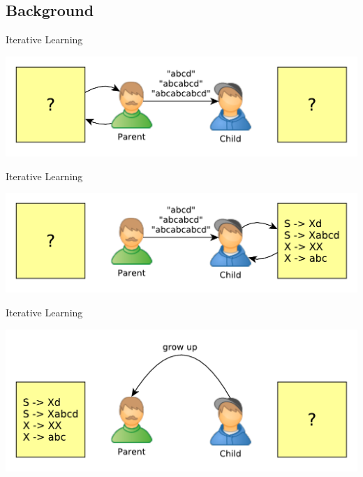 \documentclass[11pt,a4paper,xcolor=dvipsnames]{beamer}
\begin{document}
\subsection{Background}
\begin{frame}{Iterative Learning}
  \begin{center}
    \includegraphics[scale=0.6]{assets/iterative1.pdf}
  \end{center}
\end{frame}

\begin{frame}{Iterative Learning}
  \begin{center}
    \includegraphics[scale=0.6]{assets/iterative2.pdf}
  \end{center}
\end{frame}

\begin{frame}{Iterative Learning}
  \begin{center}
    \includegraphics[scale=0.6]{assets/iterative3.pdf}
  \end{center}
\end{frame}
\end{document}
